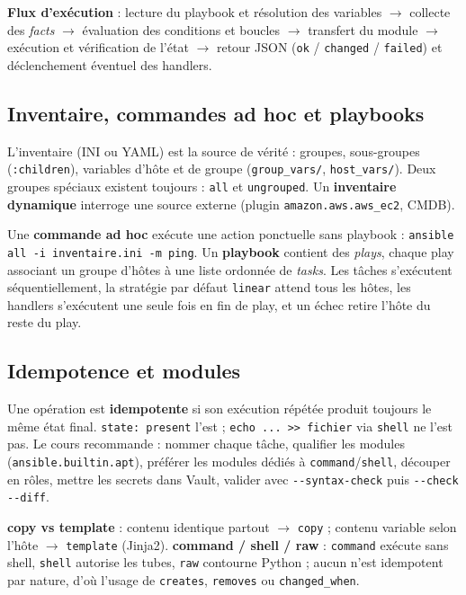 \documentclass[11pt,a4paper]{article}
\begin{document}
\textbf{Flux d'exécution} : lecture du playbook et résolution des variables $\rightarrow$ collecte des
\emph{facts} $\rightarrow$ évaluation des conditions et boucles $\rightarrow$ transfert du module
$\rightarrow$ exécution et vérification de l'état $\rightarrow$ retour JSON (\texttt{ok} / \texttt{changed}
/ \texttt{failed}) et déclenchement éventuel des handlers.

\subsection{Inventaire, commandes ad hoc et playbooks}
L'inventaire (INI ou YAML) est la source de vérité : groupes, sous-groupes (\texttt{:children}), variables
d'hôte et de groupe (\texttt{group\_vars/}, \texttt{host\_vars/}). Deux groupes spéciaux existent toujours :
\texttt{all} et \texttt{ungrouped}. Un \textbf{inventaire dynamique} interroge une source externe
(plugin \texttt{amazon.aws.aws\_ec2}, CMDB).

Une \textbf{commande ad hoc} exécute une action ponctuelle sans playbook :
\texttt{ansible all -i inventaire.ini -m ping}. Un \textbf{playbook} contient des \emph{plays}, chaque play
associant un groupe d'hôtes à une liste ordonnée de \emph{tasks}. Les tâches s'exécutent
séquentiellement, la stratégie par défaut \texttt{linear} attend tous les hôtes, les handlers s'exécutent
une seule fois en fin de play, et un échec retire l'hôte du reste du play.

\subsection{Idempotence et modules}
Une opération est \textbf{idempotente} si son exécution répétée produit toujours le même état final.
\texttt{state: present} l'est ; \texttt{echo ... >> fichier} via \texttt{shell} ne l'est pas.
Le cours recommande : nommer chaque tâche, qualifier les modules (\texttt{ansible.builtin.apt}),
préférer les modules dédiés à \texttt{command}/\texttt{shell}, découper en rôles, mettre les secrets
dans Vault, valider avec \texttt{-{}-syntax-check} puis \texttt{-{}-check -{}-diff}.

\textbf{copy vs template} : contenu identique partout $\rightarrow$ \texttt{copy} ; contenu variable selon
l'hôte $\rightarrow$ \texttt{template} (Jinja2). \textbf{command / shell / raw} : \texttt{command} exécute
sans shell, \texttt{shell} autorise les tubes, \texttt{raw} contourne Python ; aucun n'est idempotent par
nature, d'où l'usage de \texttt{creates}, \texttt{removes} ou \texttt{changed\_when}.
\end{document}
